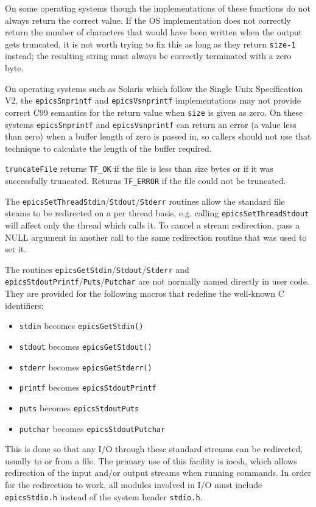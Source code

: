 On some operating systems though the implementations of these functions do not always return the correct value.
If the OS implementation does not correctly return the number of characters that would have been written when the output gets truncated, it is not worth trying to fix this as long as they return \verb|size-1| instead; the resulting string must always be correctly terminated with a zero byte.

On operating systems such as Solaris which follow the Single Unix Specification V2, the \verb|epicsSnprintf| and \verb|epicsVsnprintf| implementations may not provide correct C99 semantics for the return value when \verb|size| is given as zero.
On these systems \verb|epicsSnprintf| and \verb|epicsVsnprintf| can return an error (a value less than zero) when a buffer length of zero is passed in, so callers should not use that technique to calculate the length of the buffer required.

\verb|truncateFile| returns \verb|TF_OK| if the file is less than size bytes or if it was successfully truncated.
Returns \verb|TF_ERROR| if the file could not be truncated.

The \verb|epicsSetThreadStdin|/\verb|Stdout|/\verb|Stderr| routines allow the standard file steams to be redirected on a per thread basis, e.g. calling \verb|epicsSetThreadStdout| will affect only the thread which calls it.
To cancel a stream redirection, pass a NULL argument in another call to the same redirection routine that was used to set it.

The routines \verb|epicsGetStdin|/\verb|Stdout|/\verb|Stderr| and \verb|epicsStdoutPrintf|/\verb|Puts|/\verb|Putchar| are not normally named directly in user code.
They are provided for the following macros that redefine the well-known C identifiers:

\begin{itemize}
\item \verb|stdin| becomes \verb|epicsGetStdin()|
\item \verb|stdout| becomes \verb|epicsGetStdout()|
\item \verb|stderr| becomes \verb|epicsGetStderr()|
\item \verb|printf| becomes \verb|epicsStdoutPrintf|
\item \verb|puts| becomes \verb|epicsStdoutPuts|
\item \verb|putchar| becomes \verb|epicsStdoutPutchar|
\end{itemize}

This is done so that any I/O through these standard streams can be redirected, usually to or from a file.
The primary use of this facility is iocsh, which allows redirection of the input and/or output streams when running commands.
In order for the redirection to work, all modules involved in I/O must include \verb|epicsStdio.h| instead of the system header \verb|stdio.h|.

